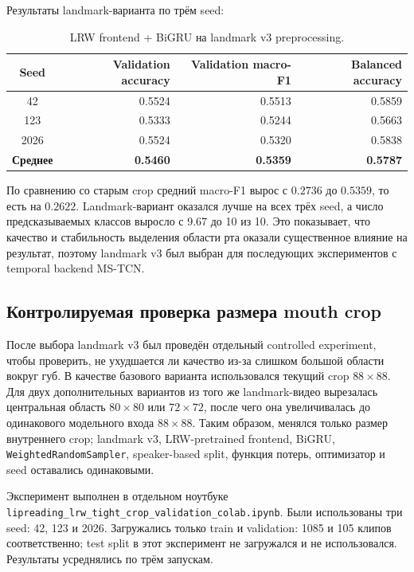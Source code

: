 \documentclass[12pt,a4paper]{article}
\begin{document}
Результаты landmark-варианта по трём seed:

\begin{table}[htbp]
\centering
\begin{tabular}{crrr}
\toprule
Seed & Validation accuracy & Validation macro-F1 & Balanced accuracy \\
\midrule
42 & 0.5524 & 0.5513 & 0.5859 \\
123 & 0.5333 & 0.5244 & 0.5663 \\
2026 & 0.5524 & 0.5320 & 0.5838 \\
\textbf{Среднее} & \textbf{0.5460} & \textbf{0.5359} & \textbf{0.5787} \\
\bottomrule
\end{tabular}
\caption{LRW frontend + BiGRU на landmark v3 preprocessing.}
\end{table}

По сравнению со старым crop средний macro-F1 вырос с $0.2736$ до $0.5359$,
то есть на $0.2622$. Landmark-вариант оказался лучше на всех трёх seed, а
число предсказываемых классов выросло с 9.67 до 10 из 10. Это показывает, что
качество и стабильность выделения области рта оказали существенное влияние на
результат, поэтому landmark v3 был выбран для последующих экспериментов с
temporal backend MS-TCN.

\subsection{Контролируемая проверка размера mouth crop}

После выбора landmark v3 был проведён отдельный controlled experiment, чтобы
проверить, не ухудшается ли качество из-за слишком большой области вокруг губ.
В качестве базового варианта использовался текущий crop $88\times88$. Для
двух дополнительных вариантов из того же landmark-видео вырезалась
центральная область $80\times80$ или $72\times72$, после чего она увеличивалась
до одинакового модельного входа $88\times88$. Таким образом, менялся только
размер внутреннего crop; landmark v3, LRW-pretrained frontend, BiGRU,
\texttt{WeightedRandomSampler}, speaker-based split, функция потерь,
оптимизатор и seed оставались одинаковыми.

Эксперимент выполнен в отдельном ноутбуке
\texttt{lipreading\_lrw\_tight\_crop\_validation\_colab.ipynb}. Были
использованы три seed: 42, 123 и 2026. Загружались только train и validation:
1085 и 105 клипов соответственно; test split в этот эксперимент не
загружался и не использовался. Результаты усреднялись по трём запускам.
\end{document}
